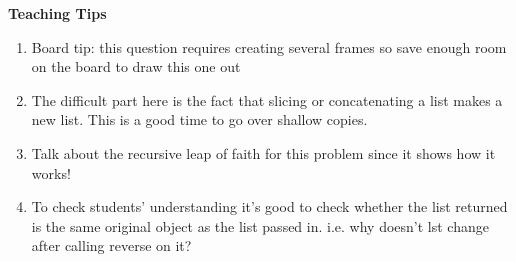 \begin{parts}
\begin{blocksection}






 \end{blocksection}
\end{parts}
\begin{blocksection}
	\begin{guide}
	\textbf{Teaching Tips}
	\begin{enumerate}
			\item Board tip: this question requires creating several frames so save enough room on the board to draw this one out 
            \item The difficult part here is the fact that slicing or concatenating a list makes a new list. This is a good time to go over shallow copies.
            \item Talk about the recursive leap of faith for this problem since it shows how it works!
            \item To check students' understanding it's good to check whether the list returned is the same original object as the list passed in. i.e. why doesn't lst change after calling reverse on it?
	\end{enumerate}
	\end{guide}
\end{blocksection}